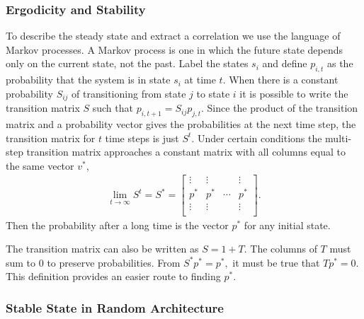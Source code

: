 \subsubsection{Ergodicity and Stability} \label{subsub:ergstab}

To describe the steady state and extract a correlation we use the language of Markov processes. A Markov process is one in which the future state depends only on the current state, not the past. Label the states $s_i$ and define $p_{i,t}$ as the probability that the system is in state $s_i$ at time $t$. When there is a constant probability $S_{ij}$ of transitioning from state $j$ to state $i$ it is possible to write the transition matrix $S$ such that $p_{i,t+1}= S_{ij}p_{j,t}$. Since the product of the transition matrix and a probability vector gives the probabilities at the next time step, the transition matrix for $t$ time steps is just $S^t$. Under certain conditions the multi-step transition matrix approaches a constant matrix with all columns equal to the same vector $v^*$,
\begin{align}
\lim\limits_{t\to \infty}S^t = S^* = \begin{bmatrix}
\vdots & \vdots &  & \vdots\\
p^* & p^* & \cdots & p^*\\
\vdots & \vdots &  & \vdots\\
\end{bmatrix}.
\end{align}
Then the probability after a long time is the vector $p^*$ for any initial state.

The transition matrix can also be written as $S = 1+T$. The columns of $T$ must sum to 0 to preserve probabilities. From $S^*p^* = p^*,$ it must be true that $Tp^*=0$. This definition provides an easier route to finding $p^*$.

\subsubsection{Stable State in Random Architecture}  \label{subsub:randstate}

